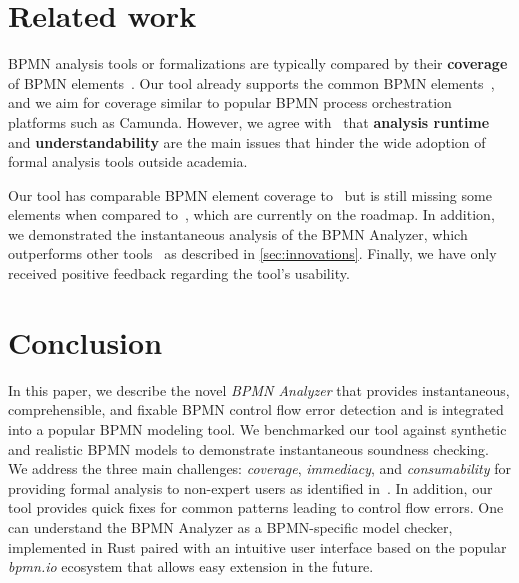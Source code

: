 \documentclass[
twocolumn
]{ceurart}
\begin{document}
\section{Related work} \label{sec:related-work}

BPMN analysis tools or formalizations are typically compared by their \textbf{coverage} of BPMN elements~\cite{krauterHigherorderTransformationApproach2024,krauterFormalizationAnalysisBPMN2023,corradiniFormalApproachAnalysis2021,houhouFirstOrderLogicVerification2022,houhouFirstOrderLogicSemantics2019}.
Our tool already supports the common BPMN elements~\cite{krauterInstantaneousComprehensibleFixable2024}, and we aim for coverage similar to popular BPMN process orchestration platforms such as Camunda.
However, we agree with~\cite{fahlandAnalysisDemandInstantaneous2011} that \textbf{analysis runtime} and \textbf{understandability} are the main issues that hinder the wide adoption of formal analysis tools outside academia.

Our tool has comparable BPMN element coverage to~\cite{corradiniFormalApproachAnalysis2021} but is still missing some elements when compared to~\cite{krauterFormalizationAnalysisBPMN2023}, which are currently on the roadmap. 
In addition, we demonstrated the instantaneous analysis of the BPMN Analyzer, which outperforms other tools~\cite{krauterFormalizationAnalysisBPMN2023,corradiniFormalApproachAnalysis2021,houhouFirstOrderLogicVerification2022} as described in \autoref{sec:innovations}.
Finally, we have only received positive feedback regarding the tool's usability.

\section{Conclusion} \label{sec:conclusion}

In this paper, we describe the novel \textit{BPMN Analyzer} that provides instantaneous, comprehensible, and fixable BPMN control flow error detection and is integrated into a popular BPMN modeling tool.
We benchmarked our tool against synthetic and realistic BPMN models to demonstrate instantaneous soundness checking.
We address the three main challenges: \textit{coverage}, \textit{immediacy}, and \textit{consumability} for providing formal analysis to non-expert users as identified in~\cite{fahlandAnalysisDemandInstantaneous2011}.
In addition, our tool provides quick fixes for common patterns leading to control flow errors.
One can understand the BPMN Analyzer as a BPMN-specific model checker, implemented in Rust paired with an intuitive user interface based on the popular \textit{bpmn.io} ecosystem that allows easy extension in the future.



\end{document}
